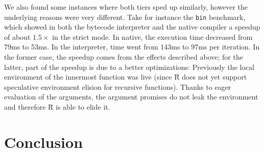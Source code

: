 \documentclass[review,nonacm,screen,acmsmall,anonymous=true]{acmart}
\newcommand{\authorcomment}[3]{}
\newcommand{\SK}[1]{\authorcomment{yellow}{SK}{#1}}
\renewcommand{\Rsh}{{\sf\u R}\xspace}
\begin{document}
We also found some instances where both tiers sped up similarly,
however the underlying reasons were very different.
Take for instance the \lstinline{bin} benchmark, which showed in both
the bytecode interpreter and the native compiler a speedup of about $1.5\times$
in the strict mode. In native, the execution time decreased from 79ms to 53ms. In
the interpreter, time went from 143ms to 97ms per iteration. In the former case, the speedup
comes from the effects described above; \SK{please review from here to the end of the paragraph} for the latter, part of the speedup is due to a better optimizations: Previously the local
environment of the innermost function was live (since \Rsh does not yet
support speculative environment elision for recursive functions). Thanks to eager
evaluation of the arguments, the argument promises do not leak the environment
and therefore \Rsh is able to elide it.

\section{Conclusion}\label{sec:conclusion}
\end{document}
